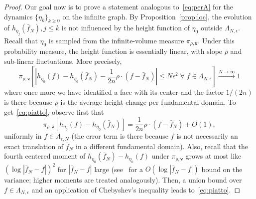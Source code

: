 \documentclass[AHL,Unicode,longabstracts,published]{cedram}
\newcommand{\ttw}{\mathtt{w}}
\let\oldforall\forall
\renewcommand*{\forall}{\mathrel{\oldforall}}
\newcommand{\ttw}{\mathtt{w}}
\begin{document}
\begin{proof}
Our goal now is to prove a statement analogous to~\eqref{eq:perA} for the dynamics $\{\eta_k\}_{k\ge0}$ on the infinite graph. By Proposition~\ref{prop:loc}, the evolution of $h_{\eta_j}(\bar f_N),j\le k$ is not influenced by the height function of $\eta_0$ outside $\Lambda_{N,\epsilon}$. Recall that $\eta_0$ is sampled from the infinite-volume measure $\pi_{\rho,\ttw}$. Under this probability measure, the height function is essentially linear, with slope $\rho$ and sub-linear fluctuations. More precisely,
\begin{equation}\label{eq:piatto}
\pi_{\rho,\ttw}\left[\left|h_{\eta_0}(f)-h_{\eta_0}(\bar f_N)-\frac1{2n}\rho\cdot(f-\bar f_N)\right|\le N\epsilon^2 \;\forall\;f\in \Lambda_{N,\epsilon}\right]\stackrel{N\to\infty}\to1
\end{equation}
where once more we have identified a face with its center and the factor $1/(2n)$ is there because $\rho$ is the average height change per fundamental domain. To get~\eqref{eq:piatto}, observe first that
\[
\pi_{\rho,\ttw}\left[h_{\eta_0}(f)-h_{\eta_0}(\bar f_N)\right]=\frac1{2n}\rho\cdot(f-\bar f_N)+O(1),
\]
uniformly in $f\in\Lambda_{\epsilon,N}$ (the error term is there because $f$ is not necessarily an exact translation of $\bar f_N$ in a different fundamental domain). Also, recall that the fourth centered moment of $h_{\eta_0}(\bar f_N)-h_{\eta_0}(f)$ under $ \pi_{\rho,\ttw}$ grows at most like $(\log|\bar f_N-f|)^{2}$ for $|\bar f_N-f|$ large (see~\cite[Section~4]{KOS03} for a $O(\log|\bar f_N-f|)$ bound on the variance; higher moments are treated analogously). Then, a union bound over $f\in \Lambda_{N,\epsilon}$ and an application of Chebyshev's inequality leads to~\eqref{eq:piatto}.


\end{proof}
\end{document}
